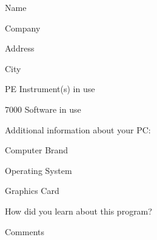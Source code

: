 Name\restofline			{}

Company\restofline

Address\restofline

City\restofline 		{}

PE Instrument(s) in use\restofline

7000 Software in use\restofline

\medskip
Additional information about your PC:

\medskip
Computer Brand\restofline 	{}

Operating System\restofline 	{}

Graphics Card\restofline 	{}

How did you learn about this program?\restofline

Comments\restofline

\mbox{}\restofline
















 
 
 
 
